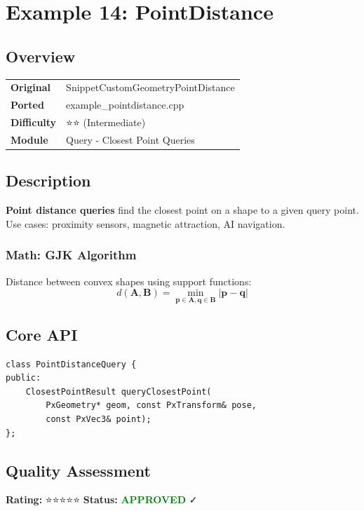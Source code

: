 \section{Example 14: PointDistance}
\subsection{Overview}
\begin{table}[h]
\centering
\begin{tabular}{|l|l|}
\hline
\textbf{Original} & SnippetCustomGeometryPointDistance \\
\textbf{Ported} & example\_pointdistance.cpp \\
\textbf{Difficulty} & ⭐⭐ (Intermediate) \\
\textbf{Module} & Query - Closest Point Queries \\
\hline
\end{tabular}
\end{table}

\subsection{Description}
\textbf{Point distance queries} find the closest point on a shape to a given query point. Use cases: proximity sensors, magnetic attraction, AI navigation.

\subsubsection{Math: GJK Algorithm}
Distance between convex shapes using support functions:
\begin{equation}
d(\mathbf{A}, \mathbf{B}) = \min_{\mathbf{p} \in \mathbf{A}, \mathbf{q} \in \mathbf{B}} |\mathbf{p} - \mathbf{q}|
\end{equation}

\subsection{Core API}
\begin{lstlisting}
class PointDistanceQuery {
public:
    ClosestPointResult queryClosestPoint(
        PxGeometry* geom, const PxTransform& pose,
        const PxVec3& point);
};
\end{lstlisting}

\subsection{Quality Assessment}
\textbf{Rating:} ⭐⭐⭐⭐⭐ \quad \textbf{Status:} \textcolor{green}{\textbf{APPROVED}} ✓

